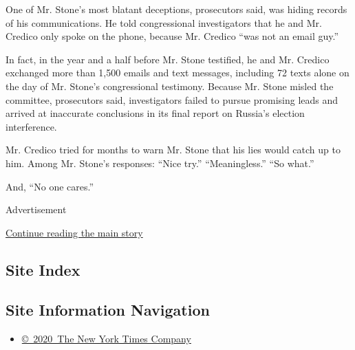 One of Mr. Stone's most blatant deceptions, prosecutors said, was hiding
records of his communications. He told congressional investigators that
he and Mr. Credico only spoke on the phone, because Mr. Credico ``was
not an email guy.''

In fact, in the year and a half before Mr. Stone testified, he and Mr.
Credico exchanged more than 1,500 emails and text messages, including 72
texts alone on the day of Mr. Stone's congressional testimony. Because
Mr. Stone misled the committee, prosecutors said, investigators failed
to pursue promising leads and arrived at inaccurate conclusions in its
final report on Russia's election interference.

Mr. Credico tried for months to warn Mr. Stone that his lies would catch
up to him. Among Mr. Stone's responses: ``Nice try.'' ``Meaningless.''
``So what.''

And, ``No one cares.''

Advertisement

\protect\hyperlink{after-bottom}{Continue reading the main story}

\hypertarget{site-index}{%
\subsection{Site Index}\label{site-index}}

\hypertarget{site-information-navigation}{%
\subsection{Site Information
Navigation}\label{site-information-navigation}}

\begin{itemize}
\tightlist
\item
  \href{https://help.nytimes.com/hc/en-us/articles/115014792127-Copyright-notice}{©~2020~The
  New York Times Company}
\end{itemize}

